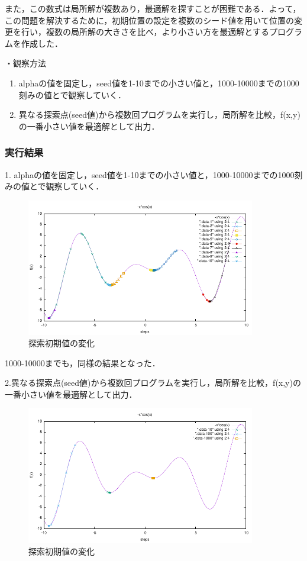 また，この数式は局所解が複数あり，最適解を探すことが困難である．よって，この問題を解決するために，初期位置の設定を複数のシード値を用いて位置の変更を行い，複数の局所解の大きさを比べ，より小さい方を最適解とするプログラムを作成した．

・観察方法
\begin{enumerate}
	\item alphaの値を固定し，seed値を1-10までの小さい値と，1000-10000までの1000刻みの値とで観察していく．
	\item 異なる探索点(seed値)から複数回プログラムを実行し，局所解を比較，f(x,y)の一番小さい値を最適解として出力．
\end{enumerate}

\subsubsection{実行結果}
1. alphaの値を固定し，seed値を1-10までの小さい値と，1000-10000までの1000刻みの値とで観察していく．
\begin{figure}[ht]
 \begin{center}
  \includegraphics[width=10.0cm]{figs/level2.3/seed-1-10.pdf}
  \caption{探索初期値の変化}
	\label{trans_seed}
 \end{center}
\end{figure}

1000-10000までも，同様の結果となった．

2.異なる探索点(seed値)から複数回プログラムを実行し，局所解を比較，f(x,y)の一番小さい値を最適解として出力．
\begin{figure}[ht]
 \begin{center}
  \includegraphics[width=10.0cm]{figs/level2.3/compare_seed.pdf}
  \caption{探索初期値の変化}
	\label{compare_seed}
 \end{center}
\end{figure}

